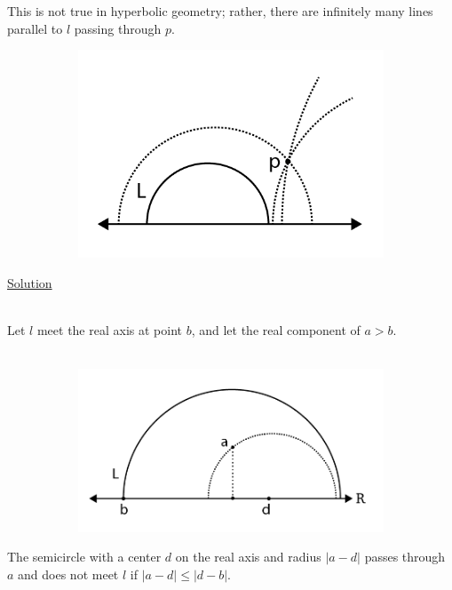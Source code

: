 \documentclass[12pt]{article}
\newcommand{\ulind}[1]
{
\noindent
\underline{#1}\\\\
\indent
}
\begin{document}
\clearpage

This is not true in hyperbolic geometry; rather, there are infinitely many lines parallel to $l$ passing through $p$.

\begin{figure}[h!]
  \centering
      \begin{subfigure}[b]{0.5\linewidth}
    \includegraphics[width=\linewidth]{./assets/11-1-1/parallel-postulate-hyperbolic.png}
  \end{subfigure}
  \end{figure}
  \indent

\ulind{Solution}

Let $l$ meet the real axis at point $b$, and let the real component of $a > b$.\\\\

\begin{figure}[h!]
  \centering
      \begin{subfigure}[b]{0.75\linewidth}
    \includegraphics[width=\linewidth]{./assets/11-1-1/non-intersecting.png}
  \end{subfigure}
  \end{figure}
  \indent
  
The semicircle with a center $d$ on the real axis and radius $|a - d|$ passes through $a$ and does not meet  $l$ if $|a - d| \leq |d-b|$.
\end{document}

